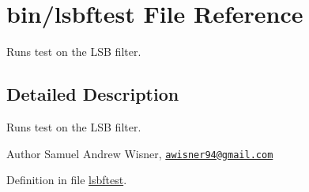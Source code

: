 \hypertarget{lsbftest}{\section{bin/lsbftest File Reference}
\label{lsbftest}
}


Runs test on the L\+S\+B filter.  




\subsection{Detailed Description}
Runs test on the L\+S\+B filter. 

\begin{DoxyAuthor}{Author}
Samuel Andrew Wisner, \href{mailto:awisner94@gmail.com}{\tt awisner94@gmail.\+com} 
\end{DoxyAuthor}


Definition in file \hyperlink{lsbftest_source}{lsbftest}.

